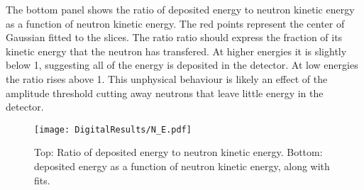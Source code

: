 \documentclass[main.tex]{subfiles}
\begin{document}
The bottom panel shows the ratio of deposited energy to neutron kinetic energy as a function of neutron kinetic energy. The red points represent the center of Gaussian fitted to the slices. 
The ratio ratio should express the fraction of its kinetic energy that the neutron has transfered. At higher energies it is slightly below 1, suggesting all of the energy is deposited in the detector. At low energies the ratio rises above 1. This unphysical behaviour is likely an effect of the amplitude threshold cutting away neutrons that leave little energy in the detector.

\begin{figure}[ht]
    \centering
        \texttt{[image: DigitalResults/N\_E.pdf]}
        \caption[Neutron kinetic energy and deposited energy.]{Top: Ratio of deposited energy to neutron kinetic energy. Bottom: deposited energy as a function of neutron kinetic energy, along with fits.}
    \label{fig:N_E} 
\end{figure}
\end{document}
